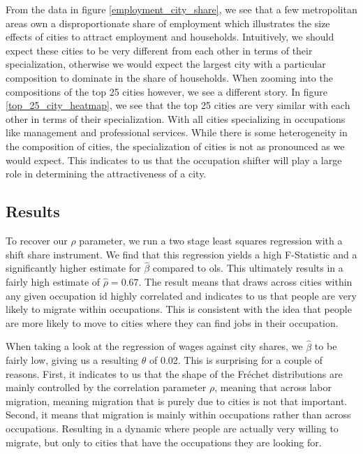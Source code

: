 \documentclass[10pt]{article}
\begin{document}
From the data in figure \ref{employment_city_share}, we see that a few metropolitan areas own a disproportionate share of employment which illustrates the size effects of cities to attract employment and households. Intuitively, we should expect these cities to be very different from each other in terms of their specialization, otherwise we would expect the largest city with a particular composition to dominate in the share of households. When zooming into the compositions of the top 25 cities however, we see a different story. In figure \ref{top_25_city_heatmap}, we see that the top 25 cities are very similar with each other in terms of their specialization. With all cities specializing in occupations like management and professional services. While there is some heterogeneity in the composition of cities, the specialization of cities is not as pronounced as we would expect. This indicates to us that the occupation shifter will play a large role in determining the attractiveness of a city.

\subsection{Results}

To recover our $\rho$ parameter, we run a two stage least squares regression with a shift share instrument. We find that this regression yields a high F-Statistic and a significantly higher estimate for $\hat{\beta}$ compared to ols. This ultimately results in a fairly high estimate of $\hat{\rho} = 0.67$. The result means that draws across cities within any given occupation id highly correlated and indicates to us that people are very likely to migrate within occupations. This is consistent with the idea that people are more likely to move to cities where they can find jobs in their occupation.

When taking a look at the regression of wages against city shares, we $\hat{\beta}$ to be fairly low, giving us a resulting $\theta$ of 0.02. This is surprising for a couple of reasons. First, it indicates to us that the shape of the Fr\'{e}chet distributions are mainly controlled by the correlation parameter $\rho$, meaning that across labor migration, meaning migration that is purely due to cities is not that important. Second, it means that migration is mainly within occupations rather than across occupations. Resulting in a dynamic where people are actually very willing to migrate, but only to cities that have the occupations they are looking for.
\end{document}
